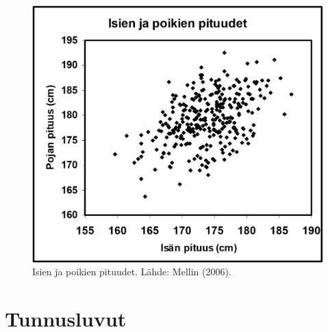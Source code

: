 \documentclass[
]{book}
\begin{document}
\begin{figure}

{\centering \includegraphics[width=0.75\linewidth]{images/Isien-poikien-pituudet-Mellin} 

}

\caption{Isien ja poikien pituudet. Lähde: Mellin (2006).}\label{fig:isatjapojat1}
\end{figure}

\hypertarget{alaluku63}{%
\section{Tunnusluvut}\label{alaluku63}}
\end{document}
